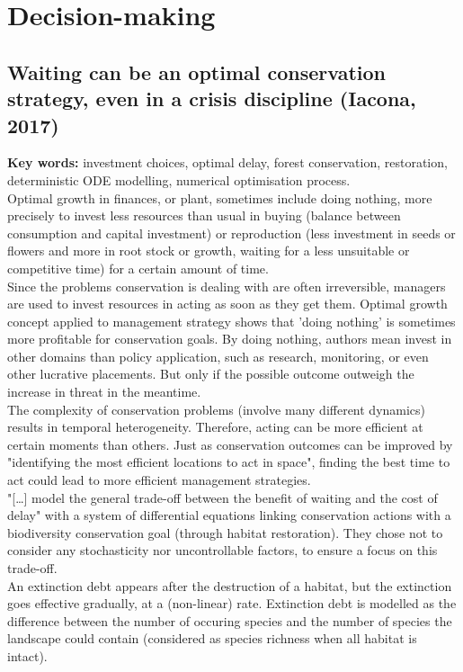 \documentclass[12pt]{article}
\begin{document}
\section{Decision-making}

\subsection{Waiting can be an optimal conservation strategy, even
in a crisis discipline (Iacona, 2017)}
\textbf{Key words:} investment choices, optimal delay, forest conservation, restoration, deterministic ODE modelling, numerical optimisation process.\\

Optimal growth in finances, or plant, sometimes include doing nothing, more precisely to invest less resources than usual in buying (balance between consumption and capital investment) or reproduction (less investment in seeds or flowers and more in root stock or growth, waiting for a less unsuitable or competitive time) for a certain amount of time.\\
Since the problems conservation is dealing with are often irreversible, managers are used to invest resources in acting as soon as they get them. Optimal growth concept applied to management strategy shows that 'doing nothing' is sometimes more profitable for conservation goals. By doing nothing, authors mean invest in other domains than policy application, such as research, monitoring, or even other lucrative placements. But only if the possible outcome outweigh the increase in threat in the meantime.\\
The complexity of conservation problems (involve many different dynamics) results in temporal heterogeneity.
Therefore, acting can be more efficient at certain moments than others.
Just as conservation outcomes can be improved by "identifying the most efficient locations to act in space", finding the best time to act could lead to more efficient management strategies.\\
"[\dots] model the general trade-off between the benefit of waiting and the cost of delay" with a system of differential equations linking conservation actions with a biodiversity conservation goal (through habitat restoration).
They chose not to consider any stochasticity nor uncontrollable factors, to ensure a focus on this trade-off.\\
An extinction debt appears after the destruction of a habitat, but the extinction goes effective gradually, at a (non-linear) rate.
Extinction debt is modelled as the difference between the number of occuring species and the number of species the landscape could contain (considered as species richness when all habitat is intact).
\end{document}
